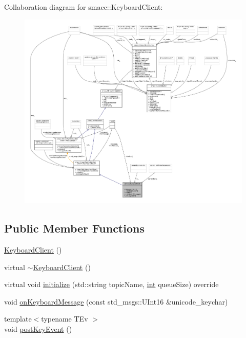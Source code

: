 Collaboration diagram for smacc\+:\+:Keyboard\+Client\+:
\nopagebreak
\begin{figure}[H]
\begin{center}
\leavevmode
\includegraphics[width=350pt]{classsmacc_1_1KeyboardClient__coll__graph}
\end{center}
\end{figure}
\subsection*{Public Member Functions}
\begin{DoxyCompactItemize}
\item 
\hyperlink{classsmacc_1_1KeyboardClient_a4d75e7c63cec3be4d52f6e80c48d0e03}{Keyboard\+Client} ()
\item 
virtual \hyperlink{classsmacc_1_1KeyboardClient_ae9d4d5f20dd058509941ab647e75fe82}{$\sim$\+Keyboard\+Client} ()
\item 
virtual void \hyperlink{classsmacc_1_1KeyboardClient_a0f845a83b14ff666559e90e3861ff207}{initialize} (std\+::string topic\+Name, \hyperlink{classint}{int} queue\+Size) override
\item 
void \hyperlink{classsmacc_1_1KeyboardClient_ab34777f20c37a6c9a647fef3a76ca522}{on\+Keyboard\+Message} (const std\+\_\+msgs\+::\+U\+Int16 \&unicode\+\_\+keychar)
\item 
{\footnotesize template$<$typename T\+Ev $>$ }\\void \hyperlink{classsmacc_1_1KeyboardClient_a3e6c9fabc11c46e389a5db3ea35de634}{post\+Key\+Event} ()
\end{DoxyCompactItemize}

